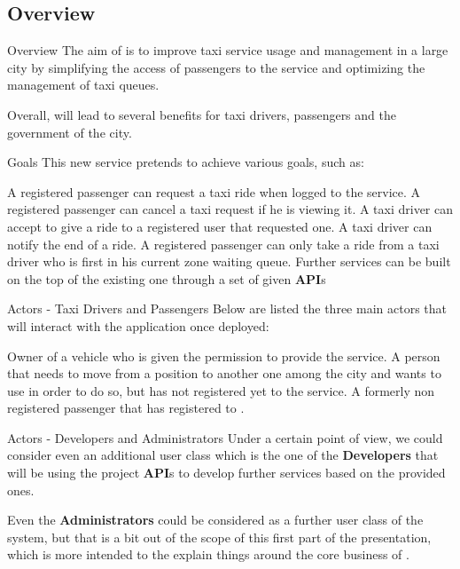 \documentclass{../common/latex_classes/pdf_presentation}
\begin{document}
	\subsection{Overview}
	\begin{frame}{Overview}
		The aim of \myTaxiService{} is to improve taxi service usage and management in a large city by simplifying the access of passengers to the service and optimizing the management of taxi queues.\par
		Overall, \myTaxiService{} will lead to several benefits for taxi drivers, passengers and the government of the city.
	\end{frame}
	\begin{frame}{Goals}
		This new service pretends to achieve various goals, such as:
		\begin{itemize}
			 A registered passenger can request a taxi ride when logged to the service.
			 A registered passenger can cancel a taxi request if he is viewing it.
			 A taxi driver can accept to give a ride to a registered user that requested one.
			 A taxi driver can notify the end of a ride.
			 A registered passenger can only take a ride from a taxi driver who is first in his current zone waiting queue.
			 Further services can be built on the top of the existing one through	a set of given \textbf{API}s
		\end{itemize}
	\end{frame}
	\begin{frame}{Actors - Taxi Drivers and Passengers}
		Below are listed the three main actors that will interact with the application once deployed:
		\begin{itemize}
			 Owner of a vehicle who is given the permission to provide the service.
			 A person that needs to move from a position	to another one among the city and wants to use \myTaxiService{} in order to do so, but has not registered yet to the service.
			 A formerly non registered passenger that has registered to \myTaxiService{}.
		\end{itemize}
	\end{frame}
	\begin{frame}{Actors - Developers and Administrators}
		Under a certain point of view, we could consider even an additional user class which is the one of the \textbf{Developers} that will be using the project \textbf{API}s to develop further services based on the provided ones.\par
		Even the \textbf{Administrators} could be considered as a further user class of the system, but that is a bit out of the scope of this first part of the presentation, which is more intended to the explain things around the core business of \myTaxiService{}.
	\end{frame}
\end{document}
